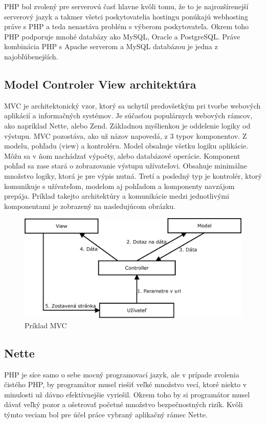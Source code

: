 PHP bol zvolený pre serverovú časť hlavne kvôli tomu, že to je najrozšírenejší serverový jazyk a takmer všetci poskytovatelia hostingu ponúkajú webhosting práve s PHP a teda nenastáva problém s výberom poskytovateľa. Okrem toho PHP podporuje mnohé databázy ako MySQL, Oracle a PostgreSQL. Práve kombinácia PHP s Apache serverom a MySQL databázou je jedna z najobľúbenejších. 

\subsection{Model Controler View architektúra}
\label{sec:mvc}
MVC je architektonický vzor, ktorý sa uchytil predovšetkým pri tvorbe webových aplikácií a informačných systémov. Je súčasťou populárnych webových rámcov, ako napríklad Nette, alebo Zend. Základnou myšlienkou je oddelenie logiky od výstupu. MVC pozostáva, ako už názov napovedá, z 3 typov komponentov. Z modelu, pohľadu (view) a kontroléru. Model obsahuje všetku logiku aplikácie. Môžu sa v ňom nachádzať výpočty, alebo databázové operácie. Komponent pohľad sa zase stará o zobrazovanie výstupu užívateľovi. Obsahuje minimálne množstvo logiky, ktorá je pre výpis nutná. Tretí a posledný typ je kontrolér, ktorý komunikuje s užívateľom, modelom aj pohľadom a komponenty navzájom prepája. Príklad takejto architektúry a komunikácie medzi jednotlivými komponentami je zobrazený na nasledujúcom obrázku.
\begin{figure}[h]
  \centering
  \includegraphics[scale=0.40]{fig/mvc.eps}
  \caption{Príklad MVC}
  \label{fig:mvc}
\end{figure}

\subsection{Nette}
\label{sec:nette}
PHP je síce samo o sebe mocný programovací jazyk, ale v prípade zvolenia čistého PHP, by programátor musel riešiť veľké množstvo vecí, ktoré niekto v minulosti už dávno efektívnejšie vyriešil. Okrem toho by si programátor musel dávať veľký pozor a ošetrovať početné množstvo bezpečnostných rizík. Kvôli týmto veciam bol pre účel práce vybraný aplikačný rámec Nette.

